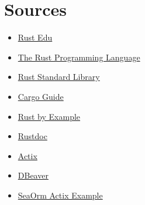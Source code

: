 \documentclass[a4paper,12pt]{article}
\begin{document}
	\newpage
	\section{Sources}
	\label{sec:Sources}
	\begin{itemize}
		\item \href{https://rust-edu.org/resources/}{Rust Edu}
		\item \href{https://doc.rust-lang.org/book/}{The Rust Programming Language}
		\item \href{https://doc.rust-lang.org/std/}{Rust Standard Library}
		\item \href{https://doc.rust-lang.org/cargo/}{Cargo Guide}
		\item \href{https://doc.rust-lang.org/rust-by-example/}{Rust by Example}
		\item \href{https://doc.rust-lang.org/rustdoc/}{Rustdoc}
		\item \href{https://actix.rs/}{Actix}
		\item \href{https://dbeaver.io/}{DBeaver}
		\item \href{https://github.com/SeaQL/SeaOrm/tree/master/examples/actix_example}{SeaOrm Actix Example}
	\end{itemize}
	\printbibliography[title={Whole bibliography}]
\end{document}
